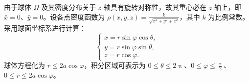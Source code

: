 \begin{solution}
    由于球体 $\Omega$ 及其密度分布关于 $z$ 轴具有旋转对称性，故其重心必在 $z$ 轴上，即 $\bar{x} = 0$、$\bar{y} = 0$。设各点密度函数为 $\rho(x, y, z) = \frac{k}{\sqrt{x^2 + y^2 + z^2}}$，其中 $k$ 为比例常数。采用球面坐标系进行计算：
    \begin{equation}
        \label{eq:Coordinate-Transformation-1}
        \begin{cases}
            x = r \sin \varphi \cos \theta, \\
            y = r \sin \varphi \sin \theta, \\
            z = r \cos \varphi.
        \end{cases}
    \end{equation}
    球体方程化为 $r \leqslant 2a \cos \varphi$，积分区域可表示为 $0 \leqslant \theta \leqslant 2\uppi$、$0 \leqslant \varphi \leqslant \frac{\uppi}{2}$、$0 \leqslant r \leqslant 2a \cos \varphi$。


\end{solution}

